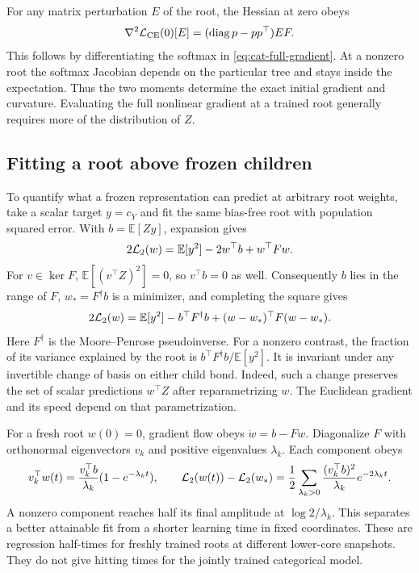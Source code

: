 For any matrix perturbation $E$ of the root, the Hessian at zero obeys
\begin{equation}
 \nabla^2 {\cal L}_{\rm CE}(0)[E]
 =(\operatorname{diag}p-pp^\top)E F .
\end{equation}
This follows by differentiating the softmax in
\eqref{eq:cat-full-gradient}. At a nonzero root the softmax Jacobian
depends on the particular tree and stays inside the expectation. Thus
the two moments determine the exact initial gradient and curvature.
Evaluating the full nonlinear gradient at a trained root generally
requires more of the distribution of $Z$.

\subsection{Fitting a root above frozen children}

To quantify what a frozen representation can predict at arbitrary root
weights, take a scalar target $y=c_Y$ and fit the same bias-free root
with population squared error. With $b=\mathbb E[Zy]$, expansion gives
\begin{equation}
 2{\cal L}_2(w)=\mathbb E[y^2]-2w^\top b+w^\top Fw .
\end{equation}
For $v\in\ker F$, $\mathbb E[(v^\top Z)^2]=0$, so $v^\top b=0$ as well.
Consequently $b$ lies in the range of $F$, $w_*=F^\dagger b$ is a
minimizer, and completing the square gives
\begin{equation}
 2{\cal L}_2(w)=\mathbb E[y^2]-b^\top F^\dagger b
                  +(w-w_*)^\top F(w-w_*) .
 \label{eq:cat-oracle}
\end{equation}
Here $F^\dagger$ is the Moore--Penrose pseudoinverse. For a nonzero contrast,
the fraction of its variance explained by the root is
$b^\top F^\dagger b/\mathbb E[y^2]$. It is invariant under any
invertible change of basis on either child bond. Indeed, such a change preserves the set of
scalar predictions $w^\top Z$ after reparametrizing $w$. The Euclidean
gradient and its speed depend on that parametrization.

For a fresh root $w(0)=0$, gradient flow obeys $\dot w=b-Fw$.
Diagonalize $F$ with orthonormal eigenvectors $v_k$ and positive
eigenvalues $\lambda_k$. Each component obeys
\begin{equation}
 v_k^\top w(t)=\frac{v_k^\top b}{\lambda_k}
       (1-e^{-\lambda_k t}),\qquad
 {\cal L}_2(w(t))-{\cal L}_2(w_*)
 =\frac12\sum_{\lambda_k>0}
 \frac{(v_k^\top b)^2}{\lambda_k}e^{-2\lambda_k t}.
\end{equation}
A nonzero component reaches half its final amplitude at
$\log 2/\lambda_k$. This separates a better attainable fit from a
shorter learning time in fixed coordinates. These are regression
half-times for freshly trained roots at different lower-core snapshots.
They do not give hitting times for the jointly trained categorical model.

